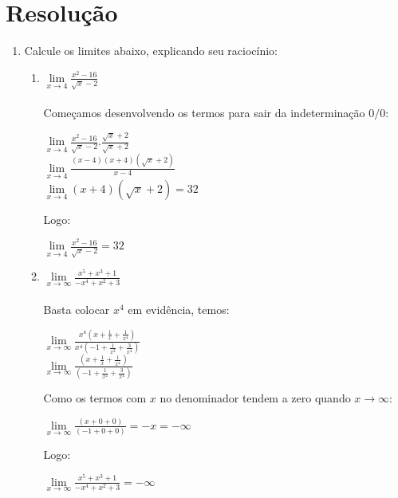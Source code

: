 \documentclass[12pt]{article}
\begin{document}
\part{Resolução}
\begin{enumerate}
	\item Calcule os limites abaixo, explicando seu raciocínio:
	\begin{enumerate}
		\item $ \lim\limits_{x \rightarrow 4} \frac{x^2-16}{\sqrt{x}-2} $\\
		\\Começamos desenvolvendo os termos para sair da indeterminação $0/0$:
		\begin{center}
			$ \lim\limits_{x \rightarrow 4} \frac{x^2-16}{\sqrt{x}-2} . \frac{\sqrt{x}+2}{\sqrt{x}+2} $\\
			$ \lim\limits_{x \rightarrow 4} \frac{(x-4)(x+4)(\sqrt{x}+2)}{x-4} $\\
			$ \lim\limits_{x \rightarrow 4} (x+4)(\sqrt{x}+2) = 32 $\\
		\end{center}
		Logo:
		\begin{center}
			$ \lim\limits_{x \rightarrow 4} \frac{x^2-16}{\sqrt{x}-2} = 32$
		\end{center}
		
		\item $ \lim\limits_{x \rightarrow \infty} \frac{x^5+x^3+1}{-x^4+x^2+3} $
		\\
		\\Basta colocar $x^4$ em evidência, temos:
		\begin{center}
			$ \lim\limits_{x \rightarrow \infty} \frac{x^4 \left( x+ \frac{1}{x}+\frac{1}{x^4} \right) }{x^4 \left( -1+ \frac{1}{x^2} + \frac{3}{x^4} \right) } $\\
			$ \lim\limits_{x \rightarrow \infty} \frac{\left( x+ \frac{1}{x}+\frac{1}{x^4} \right) }{\left( -1+ \frac{1}{x^2} + \frac{3}{x^4} \right) } $
		\end{center}
		Como os termos com $x$ no denominador tendem a zero quando $x \rightarrow \infty$:
		\begin{center}
			$ \lim\limits_{x \rightarrow \infty} \frac{\left( x+ 0+0 \right) }{\left( -1+ 0 + 0 \right) } = -x = -\infty $
		\end{center}
		Logo:
		\begin{center}
			$ \lim\limits_{x \rightarrow \infty} \frac{x^5+x^3+1}{-x^4+x^2+3} = -\infty$
		\end{center}
		

\end{enumerate}
\end{enumerate}
\end{document}
